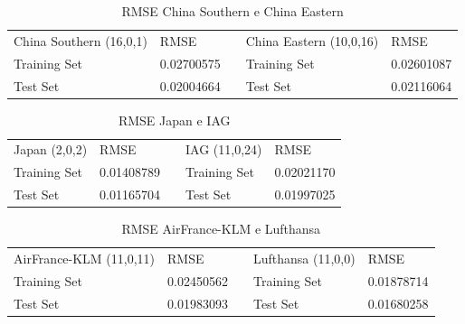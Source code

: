 \documentclass[12pt]{article}
\begin{document}
\begin{table}[H]
	\centering
	\begin{tabular}{|l|l|l|l|l|}
		\cline{1-2} \cline{4-5}
		China Southern (16,0,1) & RMSE       & \multirow{3}{*}{} & China Eastern (10,0,16) & RMSE       \\ \cline{1-2} \cline{4-5} 
		Training Set            & 0.02700575 &                   & Training Set            & 0.02601087 \\ \cline{1-2} \cline{4-5} 
		Test Set                & 0.02004664 &                   & Test Set                & 0.02116064 \\ \cline{1-2} \cline{4-5} 
	\end{tabular}
\label{tab:RMSEChina}
\caption{RMSE China Southern e China Eastern}
\end{table}

\begin{table}[H]
	\centering
	\begin{tabular}{|l|l|l|l|l|}
		\cline{1-2} \cline{4-5}
		Japan (2,0,2) & RMSE       & \multirow{3}{*}{} & IAG (11,0,24) & RMSE       \\ \cline{1-2} \cline{4-5} 
		Training Set  & 0.01408789 &                   & Training Set  & 0.02021170 \\ \cline{1-2} \cline{4-5} 
		Test Set      & 0.01165704 &                   & Test Set      & 0.01997025 \\ \cline{1-2} \cline{4-5} 
	\end{tabular}
\label{tab:RMSEJapan}
\caption{RMSE Japan e IAG}
\end{table}

\begin{table}[H]
	\centering
	\begin{tabular}{|l|l|l|l|l|}
		\cline{1-2} \cline{4-5}
		AirFrance-KLM (11,0,11) & RMSE       & \multirow{3}{*}{} & Lufthansa (11,0,0) & RMSE       \\ \cline{1-2} \cline{4-5} 
		Training Set            & 0.02450562 &                   & Training Set       & 0.01878714 \\ \cline{1-2} \cline{4-5} 
		Test Set                & 0.01983093 &                   & Test Set           & 0.01680258 \\ \cline{1-2} \cline{4-5} 
	\end{tabular}
\label{tab:RMSEKLM}
\caption{RMSE AirFrance-KLM e Lufthansa}
\end{table}
\end{document}
